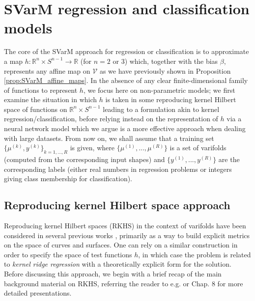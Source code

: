\documentclass[11pt]{article}
\newcommand{\R}{\mathbb{R}}
\begin{document}
\section{SVarM regression and classification models}
The core of the SVarM approach for regression or classification is to approximate a map $h:\R^n \times S^{n-1}\to \R$ (for $n=2$ or $3$) which, together with the bias $\beta$, represents any affine map on $\mathcal{V}$ as we have previously shown in Proposition \ref{prop:SVarM_affine_maps}. In the absence of any clear finite-dimensional family of functions to represent $h$, we focus here on non-parametric models; we first examine the situation in which $h$ is taken in some reproducing kernel Hilbert space of functions on $\R^n \times S^{n-1}$ leading to a formulation akin to kernel regression/classification, before relying instead on the representation of $h$ via a neural network model which we argue is a more effective approach when dealing with large datasets. From now on, we shall assume that a training set $\{\mu^{(k)},y^{(k)}\}_{k=1,\ldots,R}$ is given, where $\{\mu^{(1)},..., \mu^{(R)}\}$ is a set of varifolds (computed from the corresponding input shapes) and $\{y^{(1)}, ..., y^{(R)}\}$ are the corresponding labels (either real numbers in regression problems or integers giving class membership for classification).

\subsection{Reproducing kernel Hilbert space approach}
Reproducing kernel Hilbert spaces (RKHS) in the context of varifolds have been considered in several previous works \cite{charon2013varifold,kaltenmark2017general,hsieh2021metrics,paul2024sparse}, primarily as a way to build explicit metrics on the space of curves and surfaces. One can rely on a similar construction in order to specify the space of test functions $h$, in which case the problem is related to \emph{kernel ridge regression} with a theoretically explicit form for the solution. Before discussing this approach, we begin with a brief recap of the main background material on RKHS, referring the reader to e.g. \cite{Aronszajn1950} or \cite{younes2019shapes} Chap. 8 for more detailed presentations.
\end{document}
